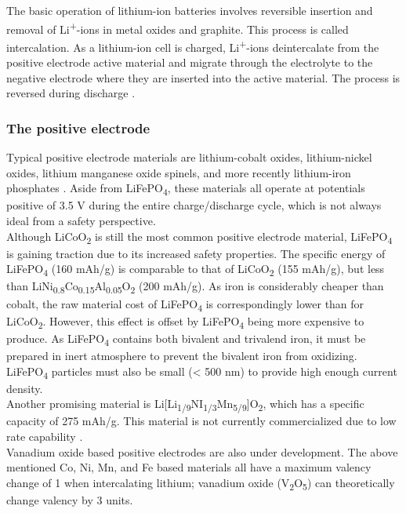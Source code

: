 \documentclass[12pt]{article} %
\begin{document}
The basic operation of lithium-ion batteries involves reversible insertion and removal of Li\textsuperscript{+}-ions in metal oxides and graphite.
This process is called intercalation.
As a lithium-ion cell is charged, Li\textsuperscript{+}-ions deintercalate from the positive electrode active material and migrate through the electrolyte to the negative electrode where they are inserted into the active material.
The process is reversed during discharge \cite{reddy_thomas_section_2011-1}.

\subsubsection{The positive electrode} %

Typical positive electrode materials are lithium-cobalt oxides, lithium-nickel oxides, lithium manganese oxide spinels, and more recently lithium-iron phosphates \cite{kulova_new_2013}.
Aside from LiFePO\textsubscript{4}, these materials all operate at potentials positive of 3.5 V during the entire charge/discharge cycle, which is not always ideal from a safety perspective.
\\
Although LiCoO\textsubscript{2} is still the most common positive electrode material, LiFePO\textsubscript{4} is gaining traction due to its increased safety properties.
The specific energy of LiFePO\textsubscript{4} (160 mAh/g) is comparable to that of LiCoO\textsubscript{2} (155 mAh/g), but less than LiNi\textsubscript{0.8}Co\textsubscript{0.15}Al\textsubscript{0.05}O\textsubscript{2} (200 mAh/g).
As iron is considerably cheaper than cobalt, the raw material cost of LiFePO\textsubscript{4} is correspondingly lower than for LiCoO\textsubscript{2}.
However, this effect is offset by LiFePO\textsubscript{4} being more expensive to produce.
As LiFePO\textsubscript{4} contains both bivalent and trivalend iron, it must be prepared in inert atmosphere to prevent the bivalent iron from oxidizing.
LiFePO\textsubscript{4} particles must also be small (< 500 nm) to provide high enough current density.
\\
Another promising material is Li[Li\textsubscript{1/9}NI\textsubscript{1/3}Mn\textsubscript{5/9}]O\textsubscript{2}, which has a specific capacity of 275 mAh/g.
This material is not currently commercialized due to low rate capability \cite{reddy_thomas_section_2011-1}.
\\
Vanadium oxide based positive electrodes are also under development.
The above mentioned Co, Ni, Mn, and Fe based materials all have a maximum valency change of 1 when intercalating lithium; vanadium oxide (V\textsubscript{2}O\textsubscript{5}) can theoretically change valency by 3 units.
\end{document}
